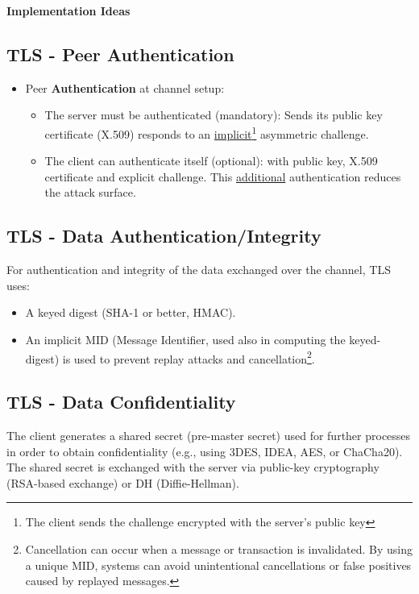 \begin{center}
    \textbf{Implementation Ideas}
\end{center}

\subsection{TLS - Peer Authentication}
\begin{itemize}
    \item Peer \textbf{Authentication} at channel setup: 
    \begin{itemize}
        \item The server must be authenticated (mandatory): Sends its public key certificate (X.509)  responds to an \uline{implicit}\footnote{The client sends the challenge encrypted with the server's public key} asymmetric challenge.
        \item The client can authenticate itself (optional): with public key, X.509 certificate and explicit challenge. This \uline{additional} authentication reduces the attack surface.
    \end{itemize}
\end{itemize}

\subsection{TLS - Data Authentication/Integrity}

For authentication and integrity of the data exchanged over the channel, TLS uses:
\begin{itemize}
    \item A keyed digest (SHA-1 or better, HMAC).
    \item An implicit MID (Message Identifier, used also in computing the keyed-digest) is used to prevent replay attacks and cancellation\footnote{Cancellation can occur when a message or transaction is invalidated. By using a unique MID, systems can avoid unintentional cancellations or false positives caused by replayed messages.}.
\end{itemize}

\subsection{TLS - Data Confidentiality}

The client generates a shared secret (pre-master secret) used for further processes in order to obtain confidentiality (e.g., using 3DES, IDEA, AES, or ChaCha20). The shared secret is exchanged with the server via public-key cryptography (RSA-based exchange) or DH (Diffie-Hellman). 

